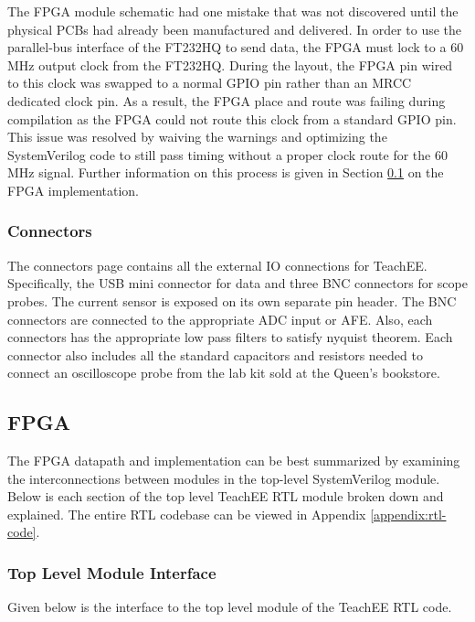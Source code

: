 \documentclass[letterpaper,11pt]{article}
\begin{document}
The FPGA module schematic had one mistake that was not discovered until the
physical PCBs had already been manufactured and delivered. In order to use the
parallel-bus interface of the FT232HQ to send data, the FPGA must lock to a 60
MHz output clock from the FT232HQ. During the layout, the FPGA pin wired to this
clock was swapped to a normal GPIO pin rather than an MRCC dedicated clock pin.
As a result, the FPGA place and route was failing during compilation as the FPGA
could not route this clock from a standard GPIO pin. This issue was resolved by
waiving the warnings and optimizing the SystemVerilog code to still pass timing
without a proper clock route for the 60 MHz signal. Further information on this
process is given in Section \ref{sec:fpga-impl} on the FPGA implementation.

\subsubsection{Connectors}
The connectors page contains all the external IO connections for TeachEE.
Specifically, the USB mini connector for data and three BNC connectors for scope
probes. The current sensor is exposed on its own separate pin header. The BNC
connectors are connected to the appropriate ADC input or AFE. Also, each
connectors has the appropriate low pass filters to satisfy nyquist theorem. Each
connector also includes all the standard capacitors and resistors needed to
connect an oscilloscope probe from the lab kit sold at the Queen's bookstore.
\subsection{FPGA} \label{sec:fpga-impl} %

The FPGA datapath and implementation can be best summarized by examining the
interconnections between modules in the top-level SystemVerilog module. Below is
each section of the top level TeachEE RTL module broken down and explained. The
entire RTL codebase can be viewed in Appendix \ref{appendix:rtl-code}.

\subsubsection{Top Level Module Interface}
Given below is the interface to the top level module of the TeachEE RTL code.
\end{document}
